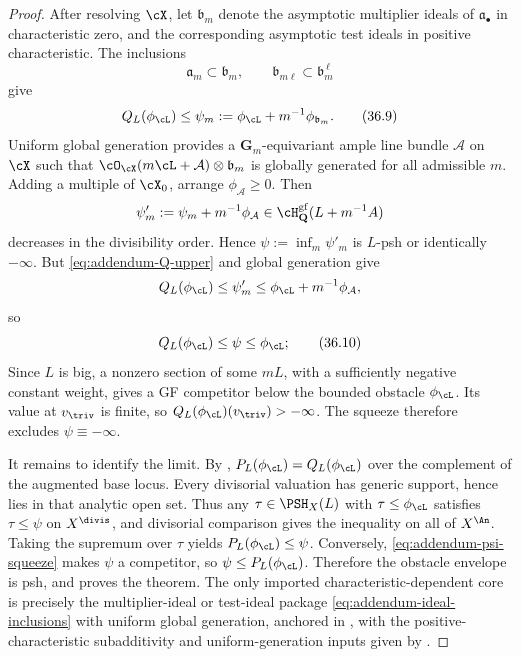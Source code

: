 \begin{proof}
After resolving $\cX$, let $\mathfrak b_m$ denote the asymptotic
multiplier ideals of $\mathfrak a_\bullet$ in characteristic zero, and
the corresponding asymptotic test ideals in positive characteristic.  The
inclusions
\[
 \mathfrak a_m\subset\mathfrak b_m,
 \qquad
 \mathfrak b_{m\ell}\subset\mathfrak b_m^{\,\ell}
\tag{36.8}\label{eq:addendum-ideal-inclusions}
\]
give
\[
 Q_L(\phi_{\cL})\leq
 \psi_m:=\phi_{\cL}+m^{-1}\phi_{\mathfrak b_m}.
\tag{36.9}\label{eq:addendum-Q-upper}
\]
Uniform global generation provides a $\mathbf G_m$-equivariant ample line
bundle $\mathcal A$ on $\cX$ such that
$\cO_{\cX}(m\cL+\mathcal A)\otimes\mathfrak b_m$ is globally generated for all
admissible $m$.  Adding a multiple of $\cX_0$, arrange
$\phi_{\mathcal A}\geq0$.  Then
\[
 \psi'_m:=\psi_m+m^{-1}\phi_{\mathcal A}
     \in\cH^{\mathrm{gf}}_{\mathbf Q}(L+m^{-1}A)
\]
decreases in the divisibility order.  Hence
$\psi:=\inf_m\psi'_m$ is $L$-psh or identically $-\infty$.  But
\eqref{eq:addendum-Q-upper} and global generation give
\[
 Q_L(\phi_{\cL})\leq\psi'_m
       \leq\phi_{\cL}+m^{-1}\phi_{\mathcal A},
\]
so
\[
                 Q_L(\phi_{\cL})\leq\psi\leq\phi_{\cL};
\tag{36.10}\label{eq:addendum-psi-squeeze}
\]
Since $L$ is big, a nonzero section of some $mL$, with a sufficiently
negative constant weight, gives a GF competitor below the bounded obstacle
$\phi_{\cL}$. Its value at $v_{\triv}$ is finite, so
$Q_L(\phi_{\cL})(v_{\triv})>-\infty$. The squeeze therefore excludes
$\psi\equiv-\infty$.

It remains to identify the limit.  By \cite[Lemma~1.5]{BJ22b},
$P_L(\phi_{\cL})=Q_L(\phi_{\cL})$ over the complement of the augmented
base locus.  Every divisorial valuation has generic support, hence lies in
that analytic open set.  Thus any $\tau\in\PSH_X(L)$ with
$\tau\leq\phi_{\cL}$ satisfies $\tau\leq\psi$ on $X^{\divis}$, and divisorial comparison
\cite[Theorem~4.22]{BJ22} gives the inequality on all of $X^{\An}$.
Taking the supremum over $\tau$ yields
$P_L(\phi_{\cL})\leq\psi$.  Conversely,
\eqref{eq:addendum-psi-squeeze} makes $\psi$ a competitor, so
$\psi\leq P_L(\phi_{\cL})$.  Therefore the obstacle envelope is psh,
and  proves the theorem.  The only
imported characteristic-dependent core is precisely the multiplier-ideal or
test-ideal package \eqref{eq:addendum-ideal-inclusions} with uniform global
generation, anchored in \cite[\S2.1]{BJ22b}, with the
positive-characteristic subadditivity and uniform-generation inputs given by
\cite[\S4 and Theorem~4.6]{GJKM19}.
\end{proof}

